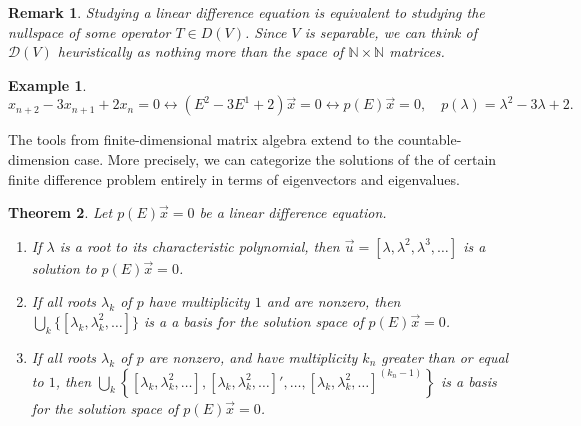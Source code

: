 \documentclass[12pt,reqno]{amsart}
\numberwithin{equation}{section}  %
\newtheorem{theorem}{Theorem}[section]
\newtheorem{remark}[theorem]{Remark}
\newtheorem{example}{Example}[section]
\begin{document}
\begin{remark}
Studying a linear difference equation is equivalent to studying the nullspace
of some operator $T \in D(V)$. Since $V$ is separable, we can think of
$\mathcal{D}(V)$ heuristically as nothing more than the space of $\mathbb{N}
\times \mathbb{N}$ matrices. 
\end{remark}
\begin{example}
\begin{equation*}
x_{n+2} - 3x_{n+1} + 2x_{n} = 0 \longleftrightarrow (E^2 - 3E^1 + 2)\vec{x} = 0
\longleftrightarrow p(E) \vec{x} = 0, \quad p(\lambda) = \lambda^2 - 3 \lambda
+2.
\end{equation*}
\end{example}
The tools from finite-dimensional matrix algebra extend to the
countable-dimension case. More precisely, we can categorize the solutions of the
of certain finite difference problem entirely in terms of eigenvectors and
eigenvalues.
\begin{theorem}
\label{thm:dif-eq}
Let $p(E) \vec{x} = 0$ be a linear difference equation. 
\begin{enumerate}
  \item 
If $\lambda$ is a root
to its characteristic polynomial, then $\vec{u} = [\lambda, \lambda^2,
\lambda^3, \ldots]$ is a solution to $p(E) \vec{x} = 0$. 
  \item 
If all roots $\lambda_k$ of $p$ have multiplicity $1$ and are nonzero, then
$ \bigcup_k \{ [\lambda_k, \lambda_k^2, \ldots] \}$ is a 
a basis for the solution space of $p(E) \vec{x} = 0$.	
\item If all roots $\lambda_k$ of $p$ are nonzero, and have multiplicity $k_n$
greater than or equal to $1$, then $\bigcup_k \left\{ [\lambda_k, \lambda_k^2,
\ldots], [\lambda_k, \lambda_k^2, \ldots]', \ldots, [\lambda_k, \lambda_k^2,
\ldots ]^{(k_n -1)} \right\}$ is a basis for the solution space of $p(E)
\vec{x} = 0$.
\end{enumerate}
\end{theorem}
\end{document}
